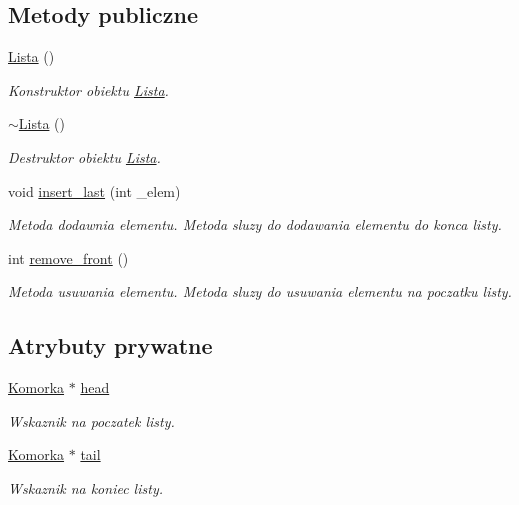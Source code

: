 \subsection*{Metody publiczne}
\begin{DoxyCompactItemize}
\item 
\hyperlink{struct_lista_a1f668b36909182ef1360b48503529a31}{Lista} ()
\begin{DoxyCompactList}\small\item\em Konstruktor obiektu \hyperlink{struct_lista}{Lista}. \end{DoxyCompactList}\item 
\hyperlink{struct_lista_a4d7394b2728a00ad8404965b2e15d096}{$\sim$\-Lista} ()
\begin{DoxyCompactList}\small\item\em Destruktor obiektu \hyperlink{struct_lista}{Lista}. \end{DoxyCompactList}\item 
void \hyperlink{struct_lista_ae3bfec9ea8f7f63172f49500ffa7bf49}{insert\-\_\-last} (int \-\_\-elem)
\begin{DoxyCompactList}\small\item\em Metoda dodawnia elementu. Metoda sluzy do dodawania elementu do konca listy. \end{DoxyCompactList}\item 
int \hyperlink{struct_lista_ad43dc38036e49d500a8ece8c3bf57ee4}{remove\-\_\-front} ()
\begin{DoxyCompactList}\small\item\em Metoda usuwania elementu. Metoda sluzy do usuwania elementu na poczatku listy. \end{DoxyCompactList}\end{DoxyCompactItemize}
\subsection*{Atrybuty prywatne}
\begin{DoxyCompactItemize}
\item 
\hyperlink{struct_komorka}{Komorka} $\ast$ \hyperlink{struct_lista_aeba20505030183d334971bd44c3c8b95}{head}
\begin{DoxyCompactList}\small\item\em Wskaznik na poczatek listy. \end{DoxyCompactList}\item 
\hyperlink{struct_komorka}{Komorka} $\ast$ \hyperlink{struct_lista_a7d42e5f99e945d97c29d6f764f71f4e7}{tail}
\begin{DoxyCompactList}\small\item\em Wskaznik na koniec listy. \end{DoxyCompactList}\end{DoxyCompactItemize}


